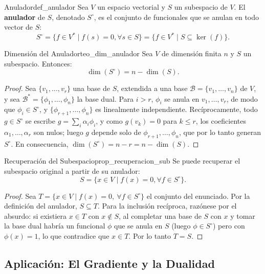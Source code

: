 \documentclass[11pt, a4paper]{article}
\begin{document}
\begin{definicion}{Anulador}{def_anulador}
Sea $V$ un espacio vectorial y $S$ un subespacio de $V$. El \textbf{anulador} de $S$, denotado $S^\circ$, es el conjunto de funcionales que se anulan en todo vector de $S$:
\[
S^\circ = \{ f \in V^* \mid f(s) = 0, \forall s \in S \} = \{ f \in V^* \mid S \subseteq \ker(f) \}.
\]
\end{definicion}

\begin{teorema}{Dimensión del Anulador}{teo_dim_anulador}
Sea $V$ de dimensión finita $n$ y $S$ un subespacio. Entonces:
\[
\dim(S^\circ) = n - \dim(S).
\]
\end{teorema}

\begin{proof}
Sea $\{v_1, \dots, v_r\}$ una base de $S$, extendida a una base $\mathcal{B} = \{v_1, \dots, v_n\}$ de $V$, y sea $\mathcal{B}^* = \{\phi_1, \dots, \phi_n\}$ la base dual. Para $i > r$, $\phi_i$ se anula en $v_1, \dots, v_r$, de modo que $\phi_i \in S^\circ$, y $\{\phi_{r+1}, \dots, \phi_n\}$ es linealmente independiente. Recíprocamente, todo $g \in S^\circ$ se escribe $g = \sum_i \alpha_i \phi_i$, y como $g(v_k) = 0$ para $k \le r$, los coeficientes $\alpha_1, \dots, \alpha_r$ son nulos; luego $g$ depende solo de $\phi_{r+1}, \dots, \phi_n$, que por lo tanto generan $S^\circ$. En consecuencia, $\dim(S^\circ) = n - r = n - \dim(S)$.
\end{proof}

\begin{proposicion}{Recuperación del Subespacio}{prop_recuperacion_sub}
Se puede recuperar el subespacio original a partir de su anulador:
\[
S = \{ x \in V \mid f(x) = 0, \forall f \in S^\circ \}.
\]
\end{proposicion}
\begin{proof}
Sea $T = \{ x \in V \mid f(x) = 0, \ \forall f \in S^\circ \}$ el conjunto del enunciado. Por la definición del anulador, $S \subseteq T$. Para la inclusión recíproca, razónese por el absurdo: si existiera $x \in T$ con $x \notin S$, al completar una base de $S$ con $x$ y tomar la base dual habría un funcional $\phi$ que se anula en $S$ (luego $\phi \in S^\circ$) pero con $\phi(x) = 1$, lo que contradice que $x \in T$. Por lo tanto $T = S$.
\end{proof}

\subsection{Aplicación: El Gradiente y la Dualidad}
\end{document}
